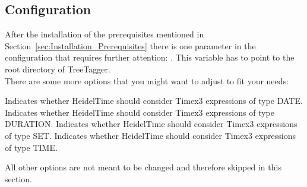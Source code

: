 \subsection{Configuration}\label{sec:Installation_Configuration}
After the installation of the prerequisites mentioned in Section~\ref{sec:Installation_Prerequisites} there is one parameter in the configuration that requires further attention: . This variable has to point to the root directory of TreeTagger.\\
There are some more options that you might want to adjust to fit your needs:
\begin{itemize}
Indicates whether HeidelTime should consider Timex3 expressions of type DATE.
Indicates whether HeidelTime should consider Timex3 expressions of type DURATION.
Indicates whether HeidelTime should consider Timex3 expressions of type SET.
Indicates whether HeidelTime should consider Timex3 expressions of type TIME.
\end{itemize}
All other options are not meant to be changed and therefore skipped in this section.
